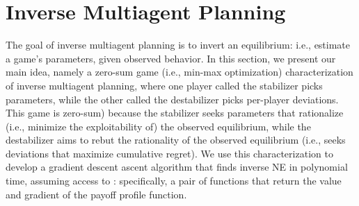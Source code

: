 \section{Inverse Multiagent Planning}
\label{sec:inverse_planning}

The goal of inverse multiagent planning is to invert an equilibrium: i.e., estimate a game's parameters, given observed behavior. 
In this section, we present our main idea, namely a zero-sum game (i.e., min-max optimization) characterization of inverse multiagent planning, where one player called the stabilizer picks parameters, while the other called the destabilizer picks per-player deviations.
This game is zero-sum) because the stabilizer seeks parameters that rationalize (i.e., minimize the exploitability of) the observed equilibrium, while the destabilizer aims to rebut the rationality of the observed equilibrium (i.e., seeks deviations that maximize cumulative regret).
%
We use this characterization to develop a gradient descent ascent algorithm that finds inverse NE in polynomial time, assuming access to : specifically, a pair of functions that return the value and gradient of the payoff profile function.

